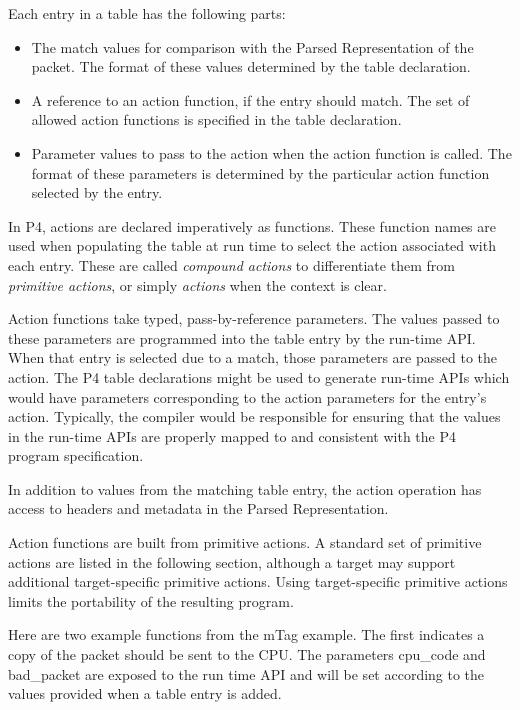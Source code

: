 \documentclass[12pt]{article}
\begin{document}
Each entry in a \matchaction table has the following parts: 

\begin{itemize}
\item
The match values for comparison with the Parsed Representation of the packet. 
The format of these values determined by the table declaration.
\item
A reference to an action function, if the entry should match. The set
of allowed action functions is specified in the table declaration.
\item
Parameter values to pass to the action when the action function is called. 
The format of these parameters is determined by the particular action function 
selected by the entry.
\end{itemize}


In P4, actions are declared imperatively as functions. These function
names are used when populating the table at run time to select the
action associated with each entry. These are called \textit{compound
actions} to differentiate them from \textit{primitive actions}, or
simply \textit{actions} when the context is clear.

Action functions take typed, pass-by-reference parameters. The values 
passed to these parameters are programmed into the table entry by the run-time
API. When that entry is selected due to a match, those parameters are
passed to the action. The P4 table declarations might be used to
generate run-time APIs which would have parameters corresponding to
the action parameters for the entry's action. Typically, the compiler
would be responsible for ensuring that the values in the run-time APIs
are properly mapped to and consistent with the P4 program
specification.

In addition to values from the matching table entry, the action operation 
has access to headers and metadata in the Parsed Representation.

Action functions are built from primitive actions. A standard set of
primitive actions are listed in the following section, although a
target may support additional target-specific primitive actions. Using
target-specific primitive actions limits the portability of the resulting
program.

Here are two example functions from the mTag example.  The first indicates 
a copy of the packet should be sent to the CPU.  The parameters cpu_code 
and bad_packet are exposed to the run time API and will be set according 
to the values provided when a table entry is added.
\end{document}
